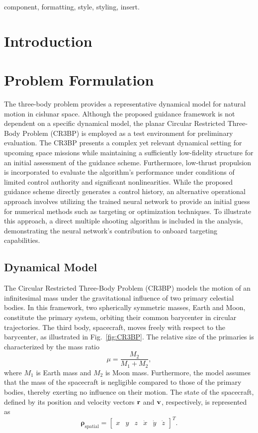 \documentclass[conference]{IEEEtran}
\begin{document}
\begin{IEEEkeywords}
component, formatting, style, styling, insert.
\end{IEEEkeywords}

\section{Introduction}
\section{Problem Formulation}
The three-body problem provides a representative dynamical model for natural motion in cislunar space. Although the proposed guidance framework is not dependent on a specific dynamical model, the planar Circular Restricted Three-Body Problem (CR3BP) is employed as a test environment for preliminary evaluation. The CR3BP presents a complex yet relevant dynamical setting for upcoming space missions while maintaining a sufficiently low-fidelity structure for an initial assessment of the guidance scheme. Furthermore, low-thrust propulsion is incorporated to evaluate the algorithm's performance under conditions of limited control authority and significant nonlinearities. While the proposed guidance scheme directly generates a control history, an alternative operational approach involves utilizing the trained neural network to provide an initial guess for numerical methods such as targeting or optimization techniques. To illustrate this approach, a direct multiple shooting algorithm is included in the analysis, demonstrating the neural network's contribution to onboard targeting capabilities.
\subsection{Dynamical Model}
The Circular Restricted Three-Body Problem (CR3BP) models the motion of an infinitesimal mass under the gravitational influence of two primary celestial bodies. In this framework, two spherically symmetric masses, Earth and Moon, constitute the primary system, orbiting their common barycenter in circular trajectories. The third body, spacecraft, moves freely with respect to the barycenter, as illustrated in Fig.~\ref{fig:CR3BP}. The relative size of the primaries is characterized by the mass ratio  
\begin{equation}
	\mu = \frac{M_2}{M_1 + M_2},
\end{equation}
where \( M_1 \) is Earth mass and \( M_2 \) is Moon mass.	
Furthermore, the model assumes that the mass of the spacecraft is negligible compared to those of the primary bodies, thereby exerting no influence on their motion. The state of the spacecraft, defined by its position and velocity vectors \( \vb{r}\) and \( \vb{v}\), respectively, is represented as  
\begin{equation}
	\boldsymbol{\rho}_{\text{spatial}} = \begin{bmatrix} x & y & z & \dot{x} & \dot{y} & \dot{z} \end{bmatrix}^T.
\end{equation}
\end{document}
